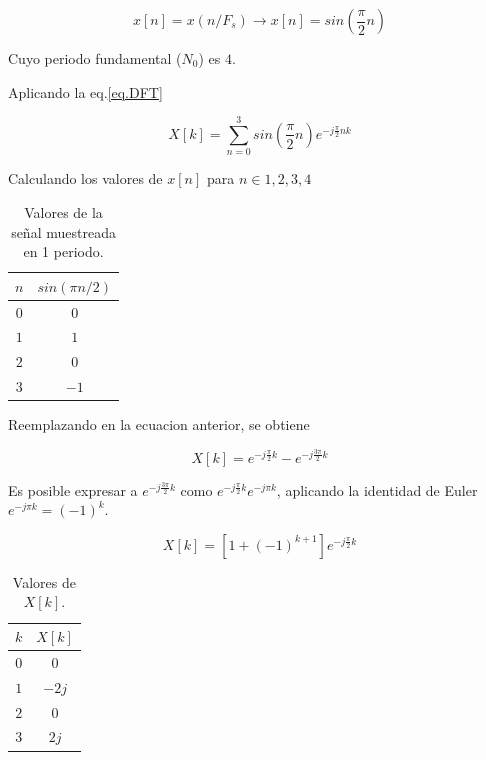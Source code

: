 \documentclass[letterpaper]{article}
\begin{document}
    \begin{equation}
        x[n]=x(n/F_s) \rightarrow x[n]= sin\left( \frac{\pi}{2} n\right)
    \end{equation}

    Cuyo periodo fundamental ($N_0$) es $4$.

    Aplicando la eq.\ref{eq.DFT}

    \begin{equation}
        X[k]= \sum_{n=0}^{3} sin\left( \frac{\pi}{2} n\right) e^{-j\frac{\pi}{2} nk}
    \end{equation}

    Calculando los valores de $x[n]$ para $n\in {1, 2, 3 ,4}$

    \begin{table}[H]
        \centering
        \begin{tabular}{|c|c|}
            \hline $n$ & $sin(\pi n/2)$ \\ 
            \hline $0$ & $0$ \\
            \hline $1$ & $1$ \\
            \hline $2$ & $0$ \\
            \hline $3$ & $-1$ \\
            \hline
        \end{tabular}
        \caption{Valores de la señal muestreada en 1 periodo.}
    \end{table}

    Reemplazando en la ecuacion anterior, se obtiene 

    \begin{equation}
        X[k]= e^{-j\frac{\pi}{2}k} - e^{-j\frac{ 3 \pi}{2}k}
    \end{equation}

    Es posible expresar a $e^{-j\frac{ 3 \pi}{2}k}$ como $e^{-j \frac{\pi }{2}k}e^{-j\pi k}$, aplicando la identidad de Euler 
    $e^{-j \pi k}= (-1)^k$. 

    \begin{equation}
        X[k]= [ 1 + (-1)^{k+1} ] e^{ -j \frac{\pi }{2} k }
    \end{equation}

    \begin{table}[H]
        \centering
        \begin{tabular}{|c|c|}
            \hline $k$ & $X[k]$ \\
            \hline $0$ & $0$ \\
            \hline $1$ & $-2j$ \\
            \hline $2$ & $0$ \\
            \hline $3$ & $2j$ \\
            \hline
        \end{tabular}
        \caption{Valores de $X[k]$.}
        \label{tab.xk}
    \end{table}
\end{document}

